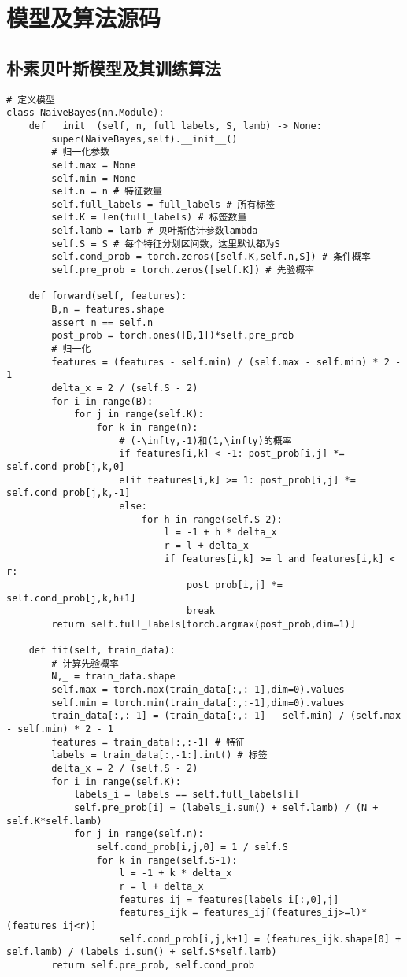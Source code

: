 \section{模型及算法源码}

\subsection{朴素贝叶斯模型及其训练算法}
\begin{lstlisting}[caption = 朴素贝叶斯模型及其训练算法实现]
# 定义模型
class NaiveBayes(nn.Module):
    def __init__(self, n, full_labels, S, lamb) -> None:
        super(NaiveBayes,self).__init__()
        # 归一化参数
        self.max = None
        self.min = None
        self.n = n # 特征数量
        self.full_labels = full_labels # 所有标签
        self.K = len(full_labels) # 标签数量
        self.lamb = lamb # 贝叶斯估计参数lambda
        self.S = S # 每个特征分划区间数，这里默认都为S
        self.cond_prob = torch.zeros([self.K,self.n,S]) # 条件概率
        self.pre_prob = torch.zeros([self.K]) # 先验概率

    def forward(self, features):
        B,n = features.shape
        assert n == self.n
        post_prob = torch.ones([B,1])*self.pre_prob
        # 归一化
        features = (features - self.min) / (self.max - self.min) * 2 - 1
        delta_x = 2 / (self.S - 2)
        for i in range(B):
            for j in range(self.K):
                for k in range(n):
                    # (-\infty,-1)和(1,\infty)的概率
                    if features[i,k] < -1: post_prob[i,j] *= self.cond_prob[j,k,0]
                    elif features[i,k] >= 1: post_prob[i,j] *= self.cond_prob[j,k,-1]
                    else:
                        for h in range(self.S-2):
                            l = -1 + h * delta_x
                            r = l + delta_x
                            if features[i,k] >= l and features[i,k] < r:
                                post_prob[i,j] *= self.cond_prob[j,k,h+1]
                                break
        return self.full_labels[torch.argmax(post_prob,dim=1)]

    def fit(self, train_data):
        # 计算先验概率
        N,_ = train_data.shape
        self.max = torch.max(train_data[:,:-1],dim=0).values
        self.min = torch.min(train_data[:,:-1],dim=0).values
        train_data[:,:-1] = (train_data[:,:-1] - self.min) / (self.max - self.min) * 2 - 1
        features = train_data[:,:-1] # 特征
        labels = train_data[:,-1:].int() # 标签
        delta_x = 2 / (self.S - 2)
        for i in range(self.K):
            labels_i = labels == self.full_labels[i]
            self.pre_prob[i] = (labels_i.sum() + self.lamb) / (N + self.K*self.lamb)
            for j in range(self.n):
                self.cond_prob[i,j,0] = 1 / self.S
                for k in range(self.S-1):
                    l = -1 + k * delta_x
                    r = l + delta_x
                    features_ij = features[labels_i[:,0],j]
                    features_ijk = features_ij[(features_ij>=l)*(features_ij<r)]
                    self.cond_prob[i,j,k+1] = (features_ijk.shape[0] + self.lamb) / (labels_i.sum() + self.S*self.lamb)
        return self.pre_prob, self.cond_prob
\end{lstlisting}

